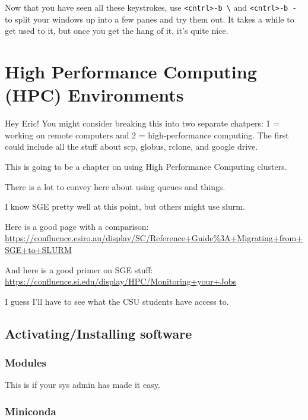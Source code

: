 \documentclass[]{krantz}
\begin{document}
Now that you have seen all these keystrokes, use \texttt{\textless{}cntrl\textgreater{}-b\ \textbackslash{}} and \texttt{\textless{}cntrl\textgreater{}-b\ -} to split your windows
up into a few panes and try them out. It takes a while to get used to it, but once you get
the hang of it, it's quite nice.

\hypertarget{high-performance-computing-hpc-environments}{%
\chapter{High Performance Computing (HPC) Environments}\label{high-performance-computing-hpc-environments}}

Hey Eric! You might consider breaking this into two separate chatpers: 1 = working on remote computers
and 2 = high-performance computing. The first could include all the stuff about scp, globus, rclone,
and google drive.

This is going to be a chapter on using High Performance Computing clusters.

There is a lot to convey here about using queues and things.

I know SGE pretty well at this point, but others might use slurm.

Here is a good page with a comparison: \url{https://confluence.csiro.au/display/SC/Reference+Guide\%3A+Migrating+from+SGE+to+SLURM}

And here is a good primer on SGE stuff: \url{https://confluence.si.edu/display/HPC/Monitoring+your+Jobs}

I guess I'll have to see what the CSU students have access to.

\hypertarget{activatinginstalling-software}{%
\section{Activating/Installing software}\label{activatinginstalling-software}}

\hypertarget{modules}{%
\subsection{Modules}\label{modules}}

This is if your sys admin has made it easy.

\hypertarget{miniconda}{%
\subsection{Miniconda}\label{miniconda}}
\end{document}
